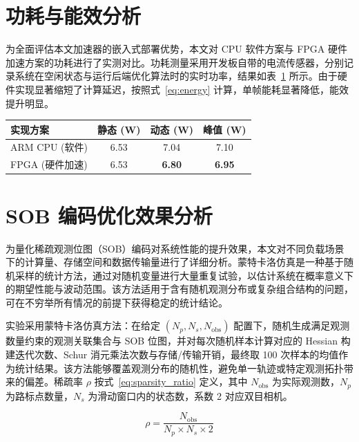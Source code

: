 \section{功耗与能效分析}

为全面评估本文加速器的嵌入式部署优势，本文对 CPU 软件方案与 FPGA 硬件加速方案的功耗进行了实测对比。功耗测量采用开发板自带的电流传感器，分别记录系统在空闲状态与运行后端优化算法时的实时功率，结果如表~\ref{tab:power} 所示。由于硬件实现显著缩短了计算延迟，按照式~\eqref{eq:energy} 计算，单帧能耗显著降低，能效提升明显。

\begin{table}[htbp]
\centering
{}
\label{tab:power}
\begin{tabular}{lccc}
\toprule
实现方案 & 静态 (W) & 动态 (W) & 峰值 (W) \\
\midrule
ARM CPU (软件) & 6.53 & 7.04 & 7.10 \\
FPGA (硬件加速) & 6.53 & \textbf{6.80} & \textbf{6.95} \\
\bottomrule
\end{tabular}
\end{table}

\section{SOB 编码优化效果分析}

为量化稀疏观测位图（SOB）编码对系统性能的提升效果，本文对不同负载场景下的计算量、存储空间和数据传输量进行了详细分析。蒙特卡洛仿真是一种基于随机采样的统计方法，通过对随机变量进行大量重复试验，以估计系统在概率意义下的期望性能与波动范围\cite{metropolis1949monte,robert2004monte}。该方法适用于含有随机观测分布或复杂组合结构的问题，可在不穷举所有情况的前提下获得稳定的统计结论。

实验采用蒙特卡洛仿真方法：在给定 $(N_p, N_s, N_{\text{obs}})$ 配置下，随机生成满足观测数量约束的观测关联集合与 SOB 位图，并对每次随机样本计算对应的 Hessian 构建迭代次数、Schur 消元乘法次数与存储/传输开销，最终取 100 次样本的均值作为统计结果。该方法能够覆盖观测分布的随机性，避免单一轨迹或特定观测拓扑带来的偏差。稀疏率 $\rho$ 按式~\eqref{eq:sparsity_ratio} 定义，其中 $N_{\text{obs}}$ 为实际观测数，$N_p$ 为路标点数量，$N_s$ 为滑动窗口内的状态数，系数 2 对应双目相机。

\begin{equation}
\rho = \frac{N_{\text{obs}}}{N_p \times N_s \times 2}
\label{eq:sparsity_ratio}
\end{equation}

